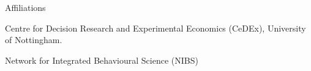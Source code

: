 \begin{rubric}{Affiliations}

%
	 Centre for Decision Research and Experimental Economics (CeDEx), University of Nottingham.

%
\entry*[2018 -- 2020]%
	Network for Integrated Behavioural Science (NIBS)  

\end{rubric}